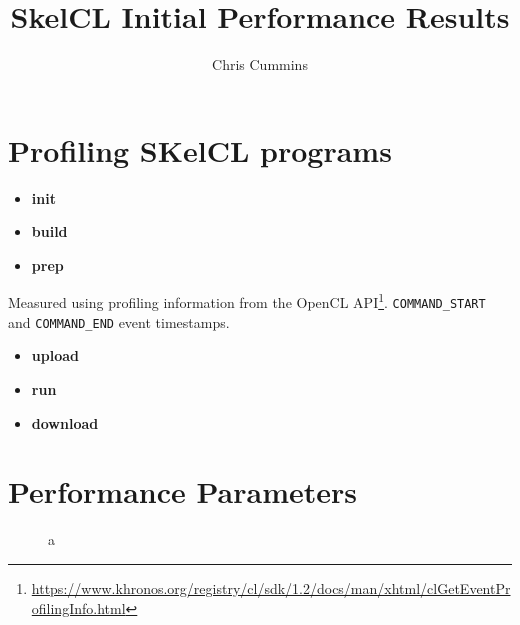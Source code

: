 
\title{SkelCL Initial Performance Results}

\author{Chris Cummins}





\maketitle

\begin{abstract}
  \noindent

\end{abstract}

\section{Profiling SKelCL programs}

\begin{itemize}
\item \textbf{init}
\item \textbf{build}
\item \textbf{prep}
\end{itemize}

Measured using profiling information from the OpenCL
API\footnote{\url{https://www.khronos.org/registry/cl/sdk/1.2/docs/man/xhtml/clGetEventProfilingInfo.html}}. \texttt{COMMAND\_START}
and \texttt{COMMAND\_END} event timestamps.

\begin{itemize}
\item \textbf{upload}
\item \textbf{run}
\item \textbf{download}
\end{itemize}

\begin{figure}
\centering

\end{figure}

\section{Performance Parameters}

\begin{figure}


\caption{a}
\label{fig:}
\end{figure}

